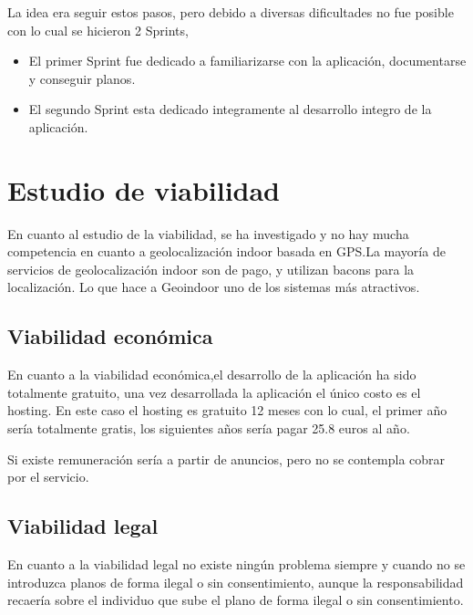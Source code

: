 La idea era seguir estos pasos, pero debido a diversas dificultades no fue posible con lo cual se hicieron 2 Sprints,
\begin{itemize}
\item
El primer Sprint fue dedicado a familiarizarse con la aplicación, documentarse y conseguir planos.
\item
El segundo Sprint esta dedicado integramente al desarrollo integro de la aplicación.
\end{itemize}
 
\section{Estudio de viabilidad}

En cuanto al estudio de la viabilidad, se ha investigado y no hay mucha competencia en cuanto a geolocalización indoor basada en GPS.La mayoría de servicios de geolocalización indoor son de pago, y utilizan bacons para la localización. Lo que hace a Geoindoor uno de los sistemas más atractivos.


\subsection{Viabilidad económica}

En cuanto a la viabilidad económica,el desarrollo de la aplicación ha sido totalmente gratuito, una vez desarrollada la aplicación el único costo es el hosting. En este caso el hosting es gratuito 12 meses con lo cual, el primer año sería totalmente gratis, los siguientes años sería pagar 25.8 euros al año.

Si existe remuneración sería a partir de anuncios, pero no se contempla cobrar por el servicio. 

\subsection{Viabilidad legal}

En cuanto a la viabilidad legal no existe ningún problema siempre y cuando no se introduzca planos de forma ilegal o sin consentimiento, aunque la responsabilidad recaería sobre el individuo que sube el plano de forma ilegal o sin consentimiento.

